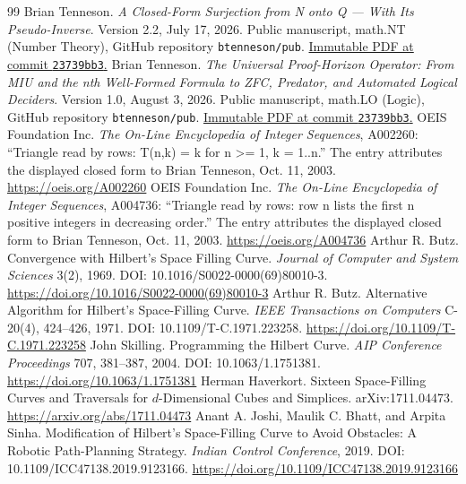 \documentclass[11pt]{article}
\theoremstyle{hilberttheorem}
\begin{document}
\clearpage
{}
{}
\label{references}
\begingroup\small\sloppy
\begin{thebibliography}{99}
 Brian Tenneson. \emph{A Closed-Form Surjection from N onto Q --- With Its Pseudo-Inverse}. Version 2.2, July 17, 2026. Public manuscript, math.NT (Number Theory), GitHub repository \texttt{btenneson/pub}. \href{https://github.com/btenneson/pub/blob/23739bb3bd04be90ef26f33717ac65feb1407b3d/math.NT%20%E2%80%94%20Number%20Theory/A%20Closed-Form%20Surjection%20from%20N%20onto%20Q%20by%20Brian%20Tenneson%202.2.pdf}{Immutable PDF at commit \texttt{23739bb3}.}
 Brian Tenneson. \emph{The Universal Proof-Horizon Operator: From MIU and the nth Well-Formed Formula to ZFC, Predator, and Automated Logical Deciders}. Version 1.0, August 3, 2026. Public manuscript, math.LO (Logic), GitHub repository \texttt{btenneson/pub}. \href{https://github.com/btenneson/pub/blob/23739bb3bd04be90ef26f33717ac65feb1407b3d/math.LO%20%E2%80%94%20Logic/The%20Universal%20Proof-Horizon%20Operator%20by%20Brian%20Tenneson%201.0.pdf}{Immutable PDF at commit \texttt{23739bb3}.}
 OEIS Foundation Inc. \emph{The On-Line Encyclopedia of Integer Sequences}, A002260: ``Triangle read by rows: T(n,k) = k for n >= 1, k = 1..n.'' The entry attributes the displayed closed form to Brian Tenneson, Oct. 11, 2003. \url{https://oeis.org/A002260}
 OEIS Foundation Inc. \emph{The On-Line Encyclopedia of Integer Sequences}, A004736: ``Triangle read by rows: row n lists the first n positive integers in decreasing order.'' The entry attributes the displayed closed form to Brian Tenneson, Oct. 11, 2003. \url{https://oeis.org/A004736}
 Arthur R. Butz. Convergence with Hilbert's Space Filling Curve. \emph{Journal of Computer and System Sciences} 3(2), 1969. DOI: 10.1016/S0022-0000(69)80010-3. \url{https://doi.org/10.1016/S0022-0000(69)80010-3}
 Arthur R. Butz. Alternative Algorithm for Hilbert's Space-Filling Curve. \emph{IEEE Transactions on Computers} C-20(4), 424--426, 1971. DOI: 10.1109/T-C.1971.223258. \url{https://doi.org/10.1109/T-C.1971.223258}
 John Skilling. Programming the Hilbert Curve. \emph{AIP Conference Proceedings} 707, 381--387, 2004. DOI: 10.1063/1.1751381. \url{https://doi.org/10.1063/1.1751381}
 Herman Haverkort. Sixteen Space-Filling Curves and Traversals for $d$-Dimensional Cubes and Simplices. arXiv:1711.04473. \url{https://arxiv.org/abs/1711.04473}
 Anant A. Joshi, Maulik C. Bhatt, and Arpita Sinha. Modification of Hilbert's Space-Filling Curve to Avoid Obstacles: A Robotic Path-Planning Strategy. \emph{Indian Control Conference}, 2019. DOI: 10.1109/ICC47138.2019.9123166. \url{https://doi.org/10.1109/ICC47138.2019.9123166}

\end{thebibliography}
\end{document}
